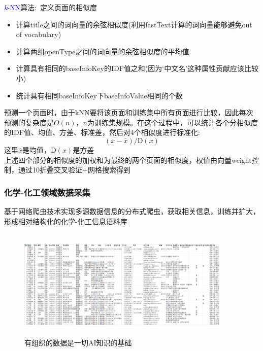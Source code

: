 \begin{frame}[allowframebreaks]
	\textcolor{blue}{\textit{k}-\textrm{NN}}算法:~定义页面的相似度
\begin{itemize}
	\item 计算\textrm{title}之间的词向量的余弦相似度(利用\textrm{fastText}计算的词向量能够避免\textrm{out of vocabulary})
	\item 计算两组\textrm{openType}之间的词向量的余弦相似度的平均值
	\item 计算具有相同的\textrm{baseInfoKey}的\textrm{IDF}值之和(因为`中文名'这种属性贡献应该比较小)
	\item 统计具有相同\textrm{baseInfoKey}下\textrm{baseInfoValue}相同的个数
\end{itemize}
预测一个页面时，由于\textrm{kNN}要将该页面和训练集中所有页面进行比较，因此每次预测的复杂度是$O(n)$，$n$为训练集规模。在这个过程中，可以统计各个分相似度的\textrm{IDF}值、均值、方差、标准差，然后对4个相似度进行标准化:
		\begin{displaymath}
			(x-\bar{x})/\mathrm{D}(x)
		\end{displaymath}
		这里$\bar{x}$是均值，$\mathrm{D}(x)$是方差\\
	上述四个部分的相似度的加权和为最终的两个页面的相似度，权值由向量\textrm{weight}控制，通过10折叠交叉验证$+$网格搜索得到
\end{frame}

\begin{frame}
	\frametitle{化学-化工领域数据采集}
	基于网络爬虫技术实现多源数据信息的分布式爬虫，获取相关信息，训练并扩大，形成相对结构化的化学-化工信息语料库 
\begin{figure}[h!]
\centering
\vskip -8pt
\includegraphics[height=2.10in,width=4.00in,viewport=0 0 210 95,clip]{Figures/KG_Chem-Info.png}
\caption{\tiny 有组织的数据是一切\textrm{AI}知识的基础}%
\label{Fig:KG_Chem-Info}
\end{figure}
\end{frame}

